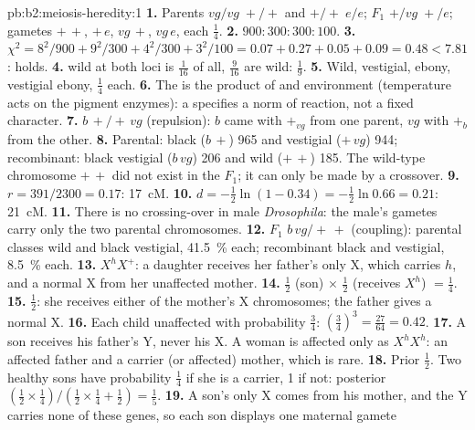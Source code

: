 \begin{solution}{pb:b2:meiosis-heredity:1}
\textbf{1.} Parents $vg/vg\;+/+$ and $+/+\;e/e$; $F_1$ $+/vg\;+/e$;
gametes $+\,+$, $+\,e$, $vg\,+$, $vg\,e$, each $\tfrac14$.
\textbf{2.} $900 : 300 : 300 : 100$.
\textbf{3.} $\chi^2 = 8^2/900 + 9^2/300 + 4^2/300 + 3^2/100 = 0.07 +
0.27 + 0.05 + 0.09 = 0.48 < 7.81$:  holds.
\textbf{4.}  wild at both loci is $\tfrac{1}{16}$ of all,
$\tfrac{9}{16}$ are wild: $\tfrac19$.
\textbf{5.} Wild, vestigial, ebony, vestigial ebony, $\tfrac14$ each.
\textbf{6.} The  is the product of  and environment
(temperature acts on the pigment enzymes): a  specifies a
norm of reaction, not a fixed character.
\textbf{7.} $b\,+/+\,vg$ (repulsion): $b$ came with $+_{vg}$ from one
parent, $vg$ with $+_b$ from the other.
\textbf{8.} Parental: black ($b\,+$) 965 and vestigial ($+\,vg$) 944;
recombinant: black vestigial ($b\,vg$) 206 and wild ($+\,+$) 185.
The wild-type chromosome $+\,+$ did not exist in the $F_1$; it can
only be made by a crossover.
\textbf{9.} $r = 391/2300 = 0.17$: \qty{17}{cM}.
\textbf{10.} $d = -\tfrac12\ln(1 - 0.34) = -\tfrac12\ln 0.66 = 0.21$:
\qty{21}{cM}.
\textbf{11.} There is no crossing-over in male \emph{Drosophila}:
the male's gametes carry only the two parental chromosomes.
\textbf{12.} $F_1$ $b\,vg/+\,+$ (coupling): parental classes wild and
black vestigial, \qty{41.5}{\%} each; recombinant black and
vestigial, \qty{8.5}{\%} each.
\textbf{13.} $X^hX^+$: a daughter receives her father's only X, which
carries $h$, and a normal X from her unaffected mother.
\textbf{14.} $\tfrac12$ (son) $\times$ $\tfrac12$ (receives $X^h$) $=
\tfrac14$.
\textbf{15.} $\tfrac12$: she receives either of the mother's X
chromosomes; the father gives a normal X.
\textbf{16.} Each child unaffected with probability $\tfrac34$:
$(\tfrac34)^3 = \tfrac{27}{64} = 0.42$.
\textbf{17.} A son receives his father's Y, never his X. A woman is
affected only as $X^hX^h$: an affected father and a carrier (or
affected) mother, which is rare.
\textbf{18.} Prior $\tfrac12$. Two healthy sons have probability
$\tfrac14$ if she is a carrier, 1 if not: posterior $(\tfrac12\times
\tfrac14)/(\tfrac12\times\tfrac14 + \tfrac12) = \tfrac15$.
\textbf{19.} A son's only X comes from his mother, and the Y carries
none of these genes, so each son displays one maternal gamete

\end{solution}
